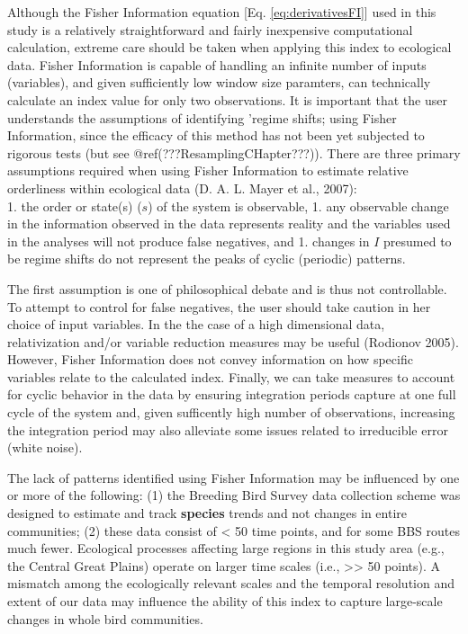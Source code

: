\documentclass[12pt,twoside,openany]{reedthesis}
\begin{document}
Although the Fisher Information equation {[}Eq.
\eqref{eq:derivativesFI}{]} used in this study is a relatively
straightforward and fairly inexpensive computational calculation,
extreme care should be taken when applying this index to ecological
data. Fisher Information is capable of handling an infinite number of
inputs (variables), and given sufficiently low window size paramters,
can technically calculate an index value for only two observations. It
is important that the user understands the assumptions of identifying
'regime shifts; using Fisher Information, since the efficacy of this
method has not been yet subjected to rigorous tests (but see
@ref(???ResamplingCHapter???)). There are three primary assumptions
required when using Fisher Information to estimate relative orderliness
within ecological data (D. A. L. Mayer et al., 2007):\\
1. the order or state(s) (\(s\)) of the system is observable, 1. any
observable change in the information observed in the data represents
reality and the variables used in the analyses will not produce false
negatives, and 1. changes in \(I\) presumed to be regime shifts do not
represent the peaks of cyclic (periodic) patterns.

The first assumption is one of philosophical debate and is thus not
controllable. To attempt to control for false negatives, the user should
take caution in her choice of input variables. In the the case of a high
dimensional data, relativization and/or variable reduction measures may
be useful (Rodionov 2005). However, Fisher Information does not convey
information on how specific variables relate to the calculated index.
Finally, we can take measures to account for cyclic behavior in the data
by ensuring integration periods capture at one full cycle of the system
and, given sufficently high number of observations, increasing the
integration period may also alleviate some issues related to irreducible
error (white noise).

The lack of patterns identified using Fisher Information may be
influenced by one or more of the following: (1) the Breeding Bird Survey
data collection scheme was designed to estimate and track
\textbf{species} trends and not changes in entire communities; (2) these
data consist of \textless{} 50 time points, and for some BBS routes much
fewer. Ecological processes affecting large regions in this study area
(e.g., the Central Great Plains) operate on larger time scales (i.e.,
\textgreater{}\textgreater{} 50 points). A mismatch among the
ecologically relevant scales and the temporal resolution and extent of
our data may influence the ability of this index to capture large-scale
changes in whole bird communities.
\end{document}
